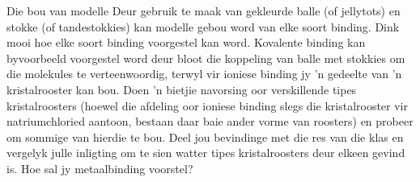         \label{m38694*id754}
            \begin{activity}{Die bou van modelle}
            \nopagebreak
Deur gebruik te maak van gekleurde balle (of jellytots) en stokke (of tandestokkies) kan modelle gebou word van elke soort binding. Dink mooi hoe elke soort binding voorgestel kan word.  Kovalente binding kan byvoorbeeld voorgestel word deur bloot die koppeling van balle met stokkies om die molekules te verteenwoordig, terwyl vir ioniese binding jy   'n gedeelte van   'n kristalrooster kan bou. Doen   'n  bietjie navorsing oor verskillende tipes kristalroosters (hoewel die afdeling oor ioniese binding slegs die kristalrooster vir natriumchloried aantoon, bestaan daar baie ander vorme van roosters) en probeer om sommige van hierdie te bou. Deel jou bevindinge met die res van die klas en vergelyk julle inligting om te sien watter tipes kristalroosters deur elkeen gevind is. Hoe sal jy metaalbinding voorstel?
\end{activity}

